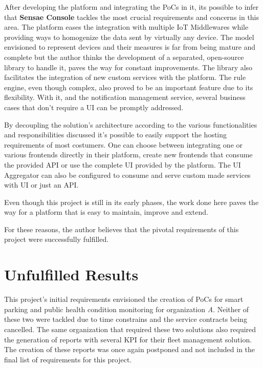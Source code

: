 After developing the platform and integrating the \gls{PoC}s in it, its possible to infer that \textbf{Sensae Console} tackles the most crucial requirements and concerns in this area. The platform eases the integration with multiple \gls{IoT} Middlewares while providing ways to homogenize the data sent by virtually any device. The model envisioned to represent devices and their measures is far from being mature and complete but the author thinks the development of a separated, open-source library to handle it, paves the way for constant improvements. The library also facilitates the integration of new custom services with the platform. The rule engine, even though complex, also proved to be an important feature due to its flexibility. With it, and the notification management service, several business cases that don't require a \gls{UI} can be promptly addressed.

By decoupling the solution's architecture according to the various functionalities and responsibilities discussed it's possible to easily support the hosting requirements of most costumers. One can choose between integrating one or various frontends directly in their platform, create new frontends that consume the provided \gls{API} or use the complete \gls{UI} provided by the platform. The \gls{UI} Aggregator can also be configured to consume and serve custom made services with \gls{UI} or just an \gls{API}.

Even though this project is still in its early phases, the work done here paves the way for a platform that is easy to maintain, improve and extend.

For these reasons, the author believes that the pivotal requirements of this project were successfully fulfilled.

\section{Unfulfilled Results}
\label{sec:conclusion:unfulfilled}

This project's initial requirements envisioned the creation of \gls{PoC}s for smart parking and public health condition monitoring for organization \textit{A}. Neither of these two were tackled due to time constrains and the service contracts being cancelled. The same organization that required these two solutions also required the generation of reports with several \gls{KPI} for their fleet management solution. The creation of these reports was once again postponed and not included in the final list of requirements for this project.

